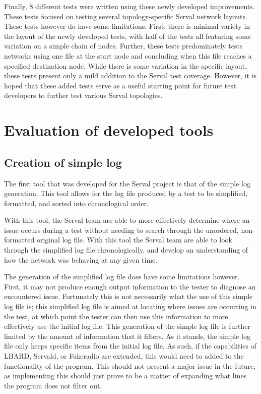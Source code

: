 Finally, 8 different tests were written using these newly developed improvements.
These tests focused on testing several topology-specific Serval network layouts.
These tests however do have some limitations. 
First, there is minimal variety in the layout of the newly developed tests, with half of the tests all featuring some variation on a simple chain of nodes.
Further, these tests predominately tests networks using one file at the start node and concluding when this file reaches a specified destination node.
While there is some variation in the specific layout, these tests present only a mild addition to the Serval test coverage.
However, it is hoped that these added tests serve as a useful starting point for future test developers to further test various Serval topologies.


\section{Evaluation of developed tools}

\subsection{Creation of simple log}
The first tool that was developed for the Serval project is that of the simple log generation.
This tool allows for the log file produced by a test to be simplified, formatted, and sorted into chronological order.

With this tool, the Serval team are able to more effectively determine where an issue occurs during a test without needing to search through the unordered, non-formatted original log file.
With this tool the Serval team are able to look through the simplified log file chronologically, and develop an understanding of how the network was behaving at any given time.

The generation of the simplified log file does have some limitations however.
First, it may not produce enough output information to the tester to diagnose an encountered issue.
Fortunately this is not necessarily what the use of this simple log file is; this simplified log file is aimed at locating where issues are occurring in the test, at which point the tester can then use this information to more effectively use the initial log file.
This generation of the simple log file is further limited by the amount of information that it filters.
As it stands, the simple log file only keeps specific items from the initial log file.
As such, if the capabilities of LBARD, Servald, or Fakeradio are extended, this would need to added to the functionality of the program.
This should not present a major issue in the future, as implementing this should just prove to be a matter of expanding what lines the program does not filter out.

